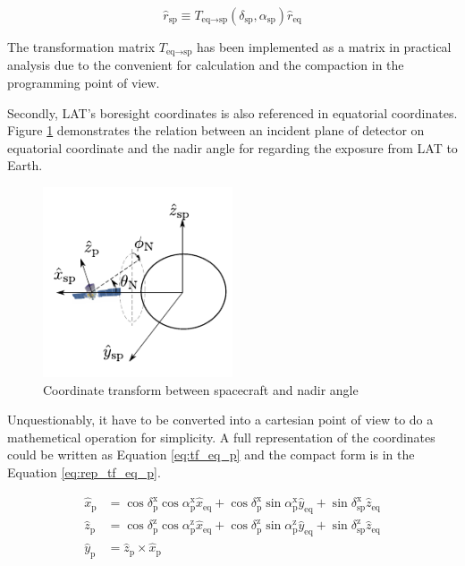 \begin{equation}
    \hat{r}_\text{sp} \equiv T_{\text{eq}\rightarrow\text{sp}} (\delta_\text{sp}, \alpha_\text{sp}) \hat{r}_\text{eq}
    \label{eq:rep_tf_eq_sp}
\end{equation}

The transformation matrix $T_{\text{eq}\rightarrow\text{sp}}$ has been implemented as a matrix in practical
analysis due to the convenient for calculation and the compaction 
in the programming point of view.

Secondly, LAT's boresight coordinates is also referenced in equatorial 
coordinates. Figure \ref{fig:coord_eq_p} demonstrates the relation between
an incident plane of detector on equatorial coordinate and the 
nadir angle for regarding the exposure from LAT to Earth.

\begin{figure}[h]
    \centering
    \includegraphics[width=0.5\textwidth]{content/methodology/figures/coord_eq_p.pdf}
    \caption{Coordinate transform between spacecraft and nadir angle}
    \label{fig:coord_eq_p}
\end{figure}

Unquestionably, it have to be converted into a cartesian 
point of view to do a mathemetical operation for simplicity. A 
full representation of the coordinates could be written as Equation \ref{eq:tf_eq_p}
and the compact form is in the Equation \ref{eq:rep_tf_eq_p}.

\begin{equation}
    \begin{split}
    \hat{x}_\text{p} &= \cos\delta^\text{x}_\text{p}\cos\alpha^\text{x}_\text{p}\hat{x}_\text{eq} + \cos\delta^\text{x}_\text{p}\sin\alpha^\text{x}_\text{p}\hat{y}_\text{eq} + \sin\delta^\text{x}_\text{sp}\hat{z}_\text{eq}\\
    \hat{z}_\text{p} &= \cos\delta^\text{z}_\text{p}\cos\alpha^\text{z}_\text{p}\hat{x}_\text{eq} + \cos\delta^\text{z}_\text{p}\sin\alpha^\text{z}_\text{p}\hat{y}_\text{eq} + \sin\delta^\text{z}_\text{sp}\hat{z}_\text{eq}\\
    \hat{y}_\text{p} &= \hat{z}_\text{p} \times \hat{x}_\text{p}
    \end{split}
    \label{eq:tf_eq_p}
\end{equation}

